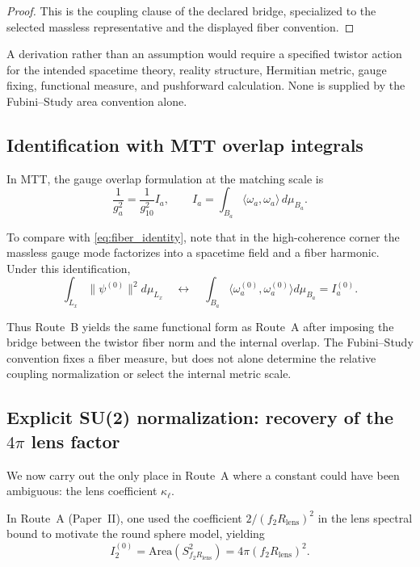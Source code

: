 \documentclass[11pt]{article}
\begin{document}
\begin{proof}
This is the coupling clause of the declared bridge, specialized to the
selected massless representative and the displayed fiber convention.
\end{proof}

\begin{remark}
A derivation rather than an assumption would require a specified twistor
action for the intended spacetime theory, reality structure, Hermitian metric,
gauge fixing, functional measure, and pushforward calculation. None is supplied
by the Fubini--Study area convention alone.
\end{remark}

\subsection{Identification with MTT overlap integrals}

In MTT, the gauge overlap formulation at the matching scale is
\begin{equation}
\frac{1}{g_a^2} = \frac{1}{g_{10}^2} I_a,
\qquad
I_a = \int_{B_a}\langle\omega_a,\omega_a\rangle\, d\mu_{B_a}.
\label{eq:MTT_overlap}
\end{equation}

To compare with \eqref{eq:fiber_identity}, note that in the high-coherence corner the
massless gauge mode factorizes into a spacetime field and a fiber harmonic. Under this
identification,
\[
\int_{L_x}\|\psi^{(0)}\|^2 d\mu_{L_x}
\quad \leftrightarrow \quad
\int_{B_a}\langle\omega_a^{(0)},\omega_a^{(0)}\rangle d\mu_{B_a}
= I_a^{(0)}.
\]

Thus Route~B yields the same functional form as Route~A after imposing the
bridge between the twistor fiber norm and the internal overlap. The
Fubini--Study convention fixes a fiber measure, but does not alone determine
the relative coupling normalization or select the internal metric scale.

\subsection{Explicit SU(2) normalization: recovery of the
\texorpdfstring{$4\pi$}{4 pi} lens factor}

We now carry out the only place in Route~A where a constant could have been ambiguous:
the lens coefficient $\kappa_\ell$.

In Route~A (Paper~II), one used the coefficient $2/(f_2R_{\mathrm{lens}})^2$ in the lens
spectral bound to motivate the round sphere model, yielding
\[
I_2^{(0)} = \mathrm{Area}(S^2_{f_2R_{\mathrm{lens}}}) = 4\pi (f_2R_{\mathrm{lens}})^2.
\]
\end{document}
